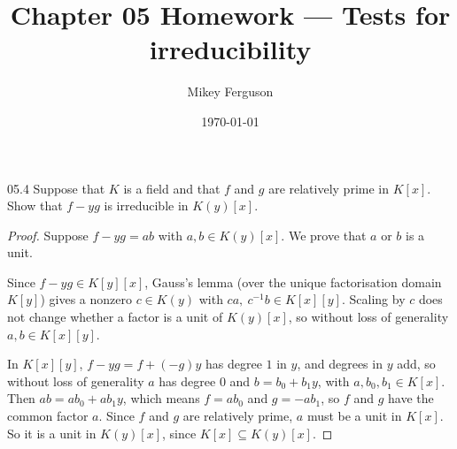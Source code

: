 \documentclass[11pt]{article}
\title{Chapter 05 Homework --- Tests for irreducibility}
\author{Mikey Ferguson}
\date{\today}
\begin{document}
\maketitle


\begin{problem}{05.4}
  Suppose that $K$ is a field and that $f$ and $g$ are relatively prime in
  $K[x]$. Show that $f-yg$ is irreducible in $K(y)[x]$.
\end{problem}
\begin{proof}
Suppose $f - yg = ab$ with $a, b \in K(y)[x]$. We prove that $a$ or $b$ is a
unit.

Since $f - yg \in K[y][x]$, Gauss's lemma (over the unique factorisation domain
$K[y]$) gives a nonzero $c \in K(y)$ with $ca,\ c^{-1}b \in K[x][y]$. Scaling by
$c$ does not change whether a factor is a unit of $K(y)[x]$, so without loss of
generality $a, b \in K[x][y]$.

In $K[x][y]$, $f - yg = f + (-g)y$ has degree $1$ in $y$, and degrees in $y$
add, so without loss of generality $a$ has degree $0$ and $b = b_0 + b_1 y$,
with $a, b_0, b_1 \in K[x]$. Then $ab = ab_0 + ab_1 y$, which means $f = ab_0$
and $g = -ab_1$, so $f$ and $g$ have the common factor $a$. Since $f$ and $g$
are relatively prime, $a$ must be a unit in $K[x]$. So it is a unit in
$K(y)[x]$, since $K[x] \subseteq K(y)[x]$.
\end{proof}
\end{document}
